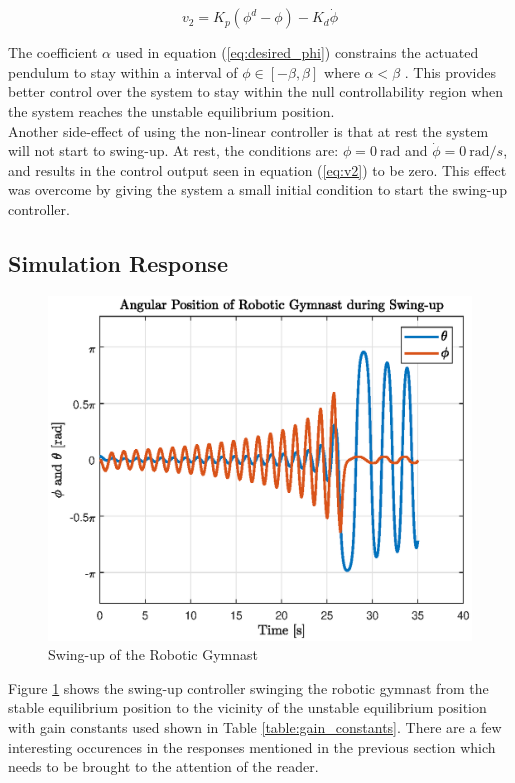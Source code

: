    
\begin{equation} \label{eq:v2}
v_{2} = K_{p}(\phi^{d}-\phi)-K_{d}\dot{\phi}
\end{equation}

The coefficient $\alpha$ used in equation (\ref{eq:desired_phi}) constrains the actuated pendulum to stay within a interval of $ \phi \in [-\beta,\beta]$ where $\alpha < \beta$ \citep{spong_swingup}. This provides better control over the system to stay within the null controllability region when the system reaches the unstable equilibrium position.\\

Another side-effect of using the non-linear controller is that at rest the system will not start to swing-up. At rest, the conditions are: $\phi = \SI{0}{\radian}$ and $\dot{\phi} = \SI{0}{\radian/s}$, and results in the control output seen in equation (\ref{eq:v2}) to be zero. This effect was overcome by giving the system a small initial condition to start the swing-up controller.


\subsection{Simulation Response}
\begin{figure}[h]
	\centering
	\includegraphics[scale=1]{./figs/swingup}
	\caption{Swing-up of the Robotic Gymnast}
	\label{fig:swingup}
\end{figure}

Figure \ref{fig:swingup} shows the swing-up controller swinging the robotic gymnast from the stable equilibrium position to the vicinity of the unstable equilibrium position with gain constants used shown in Table \ref{table:gain_constants}. There are a few interesting occurences in the responses mentioned in the previous section which needs to be brought to the attention of the reader.\\

